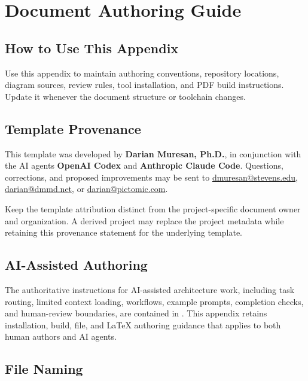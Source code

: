 \chapter{Document Authoring Guide}

\section{How to Use This Appendix}
Use this appendix to maintain authoring conventions, repository locations,
diagram sources, review rules, tool installation, and PDF build instructions.
Update it whenever the document structure or toolchain changes.

\section{Template Provenance}
This template was developed by \textbf{Darian Muresan, Ph.D.}, in conjunction
with the AI agents \textbf{OpenAI Codex} and
\textbf{Anthropic Claude Code}. Questions, corrections, and proposed
improvements may be sent to
\href{mailto:dmuresan@stevens.edu}{dmuresan@stevens.edu},
\href{mailto:darian@dmmd.net}{darian@dmmd.net}, or
\href{mailto:darian@pictomic.com}{darian@pictomic.com}.

Keep the template attribution distinct from the project-specific document
owner and organization. A derived project may replace the project metadata
while retaining this provenance statement for the underlying template.

\section{AI-Assisted Authoring}
The authoritative instructions for AI-assisted architecture work, including
task routing, limited context loading, workflows, example prompts, completion
checks, and human-review boundaries, are contained in
. This appendix retains installation, build, file, and
LaTeX authoring guidance that applies to both human authors and AI agents.

\section{File Naming}

